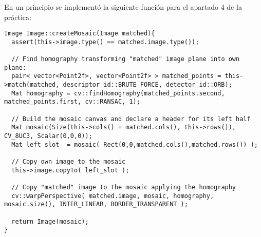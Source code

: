 \documentclass[a4paper, 11pt]{article}
\theoremstyle{definition}
\theoremstyle{theorem}
\begin{document}
  En un principio se implementó la siguiente función para el apartado 4 de la práctica:
  \begin{lstlisting}
Image Image::createMosaic(Image matched){
  assert(this->image.type() == matched.image.type());

  // Find homography transforming "matched" image plane into own plane:
  pair< vector<Point2f>, vector<Point2f> > matched_points = this->match(matched, descriptor_id::BRUTE_FORCE, detector_id::ORB);
  Mat homography = cv::findHomography(matched_points.second, matched_points.first, cv::RANSAC, 1);

  // Build the mosaic canvas and declare a header for its left half
  Mat mosaic(Size(this->cols() + matched.cols(), this->rows()), CV_8UC3, Scalar(0,0,0));
  Mat left_slot  = mosaic( Rect(0,0,matched.cols(),matched.rows()) );

  // Copy own image to the mosaic
  this->image.copyTo( left_slot );

  // Copy "matched" image to the mosaic applying the homography
  cv::warpPerspective( matched.image, mosaic, homography, mosaic.size(), INTER_LINEAR, BORDER_TRANSPARENT );

  return Image(mosaic);
}
  \end{lstlisting}
\end{document}
